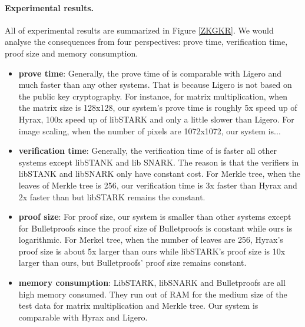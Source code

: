 \paragraph{Experimental results.} All of experimental results are summarized in Figure \ref{ZKGKR}. We would analyse the consequences from four perspectives: prove time, verification time, proof size and memory consumption.
\begin{itemize}
	\item \textbf{prove time}: Generally, the prove time of \name{} is comparable with Ligero and much faster than any other systems. That is because Ligero is not based on the public key cryptography. For instance, for matrix multiplication, when the matrix size is 128x128, our system's prove time is roughly 5x speed up of Hyrax, 100x speed up of libSTARK and only a little slower than Ligero. For image scaling, when the number of pixels are 1072x1072, our system is...
	\item \textbf{verification time}: Generally, the verification time of \name{} is faster all other systems except libSTANK and lib SNARK. The reason is that the verifiers in libSTANK and libSNARK only have constant cost. For Merkle tree, when the leaves of Merkle tree is 256, our verification time is 3x faster than Hyrax and 2x faster than but libSTARK remains the constant. 
	\item \textbf{proof size}: For proof size, our system is smaller than other systems except for Bulletproofs since the proof size of Bulletproofs is constant while ours is logarithmic. For Merkel tree, when the number of leaves are 256, Hyrax's proof size is about 5x larger than ours while libSTARK's proof size is 10x larger than ours, but Bulletproofs' proof size remains constant.  
	\item \textbf{memory consumption}: LibSTARK, libSNARK and Bulletproofs are all high memory consumed. They run out of RAM for the medium size of the test data for matrix multiplication and Merkle tree. Our system is comparable with Hyrax and Ligero.
\end{itemize}

